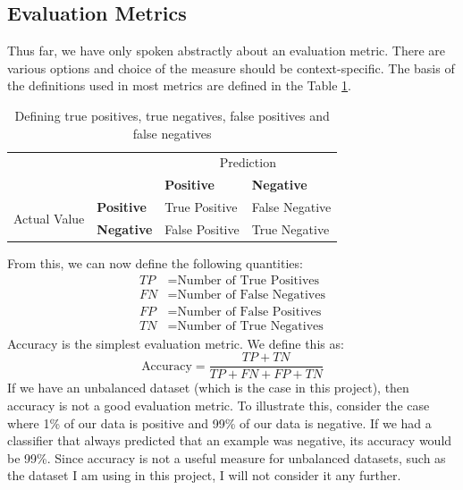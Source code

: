 \documentclass[12pt,a4paper,twoside,openright]{report}
\begin{document}
\subsection{Evaluation Metrics} \label{evaluation-metrics}
Thus far, we have only spoken abstractly about an evaluation metric. There are various options and choice of the measure should be context-specific. The basis of the definitions used in most metrics are defined in the Table \ref{table:true-positives}.
\FloatBarrier
\begin{table}[]
	\centering
	\label{table:true-positives}
	\begin{tabular}{llll}
		&                                                                    & \multicolumn{2}{c}{Prediction} \\
		& \multicolumn{1}{l|}{}                                              & \textbf{Positive}  & \textbf{Negative}  \\ \cline{2-4} 
		\multirow{2}{*}{Actual Value}&\multicolumn{1}{l|}{\textbf{Positive}} & True Positive      & False Negative     \\
		& \multicolumn{1}{l|}{\textbf{Negative}}                             & False Positive     & True Negative     
	\end{tabular}
	\caption{Defining true positives, true negatives, false positives and false negatives}
\end{table}
\FloatBarrier
From this, we can now define the following quantities:
\begin{align}
	TP & = \text{Number of True Positives} \\
	FN & = \text{Number of False Negatives} \\
	FP & = \text{Number of False Positives} \\
	TN & = \text{Number of True Negatives}
\end{align}
Accuracy is the simplest evaluation metric. We define this as:
\begin{equation}
	\text{Accuracy} = \frac{TP + TN}{TP + FN + FP + TN}
\end{equation}
If we have an unbalanced dataset (which is the case in this project), then accuracy is not a good evaluation metric. To illustrate this, consider the case where 1\% of our data is positive and 99\% of our data is negative. If we had a classifier that always predicted that an example was negative, its accuracy would be 99\%. Since accuracy is not a useful measure for unbalanced datasets, such as the dataset I am using in this project, I will not consider it any further.
\newline
\end{document}

